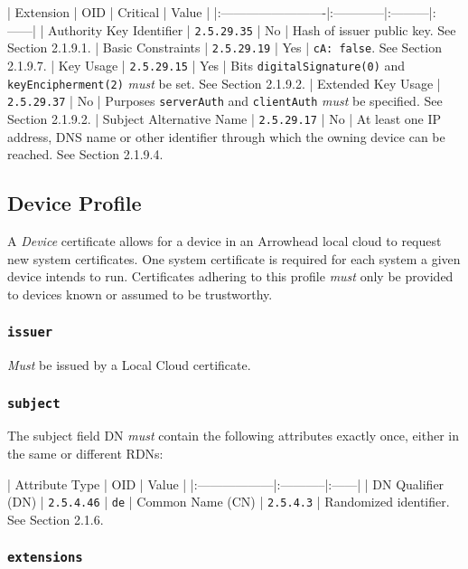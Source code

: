 | Extension                | OID         | Critical | Value |
|:-------------------------|:------------|:---------|:------|
| Authority Key Identifier | \texttt{2.5.29.35} | No       | Hash of issuer public key. See Section 2.1.9.1.
| Basic Constraints        | \texttt{2.5.29.19} | Yes      | \texttt{cA: false}. See Section 2.1.9.7.
| Key Usage                | \texttt{2.5.29.15} | Yes      | Bits \texttt{digitalSignature(0)} and \texttt{keyEncipherment(2)} \textit{must} be set. See Section 2.1.9.2.
| Extended Key Usage       | \texttt{2.5.29.37} | No       | Purposes \texttt{serverAuth} and \texttt{clientAuth} \textit{must} be specified. See Section 2.1.9.2.
| Subject Alternative Name | \texttt{2.5.29.17} | No       | At least one IP address, DNS name or other identifier through which the owning device can be reached. See Section 2.1.9.4.

\subsection{Device Profile}

A \textit{Device} certificate allows for a device in an Arrowhead local cloud to request new system certificates.
One system certificate is required for each system a given device intends to run.
Certificates adhering to this profile \textit{must} only be provided to devices known or assumed to be trustworthy.

\subsubsection{\texttt{issuer}}

\textit{Must} be issued by a Local Cloud certificate.

\subsubsection{\texttt{subject}}

The subject field DN \textit{must} contain the following attributes exactly once, either in the same or different RDNs:

| Attribute Type    | OID        | Value |
|:------------------|:-----------|:------|
| DN Qualifier (DN) | \texttt{2.5.4.46} | \texttt{de}
| Common Name (CN)  | \texttt{2.5.4.3}  | Randomized identifier. See Section 2.1.6.

\subsubsection{\texttt{extensions}}

